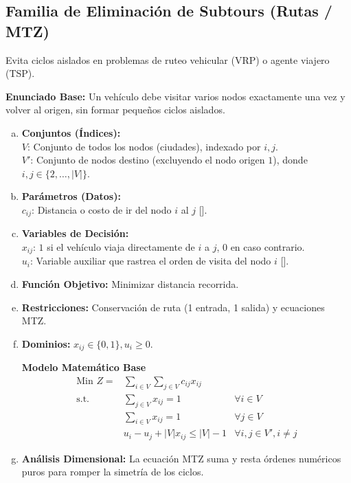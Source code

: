 \documentclass{article}
\begin{document}
	\newpage
	
	\subsection{Familia de Eliminación de Subtours (Rutas / MTZ)}
	Evita ciclos aislados en problemas de ruteo vehicular (VRP) o agente viajero (TSP).
	
	\textbf{Enunciado Base:} Un vehículo debe visitar varios nodos exactamente una vez y volver al origen, sin formar pequeños ciclos aislados.
	
	\begin{enumerate}[a)]
		\item \textbf{Conjuntos (Índices):}\\
		$V$: Conjunto de todos los nodos (ciudades), indexado por $i, j$.\\
		$V'$: Conjunto de nodos destino (excluyendo el nodo origen $1$), donde $i, j \in \{2, \dots, |V|\}$.
		
		\item \textbf{Parámetros (Datos):}\\
		$c_{ij}$: Distancia o costo de ir del nodo $i$ al $j$ [].
		
		\item \textbf{Variables de Decisión:}\\
		$x_{ij}$: $1$ si el vehículo viaja directamente de $i$ a $j$, $0$ en caso contrario.\\
		$u_i$: Variable auxiliar que rastrea el orden de visita del nodo $i$ [].
		\item \textbf{Función Objetivo:} Minimizar distancia recorrida.
		\item \textbf{Restricciones:} Conservación de ruta (1 entrada, 1 salida) y ecuaciones MTZ.
		\item \textbf{Dominios:} $x_{ij} \in \{0, 1\}, u_i \geq 0$.
		
		\begin{center}
			\textbf{Modelo Matemático Base}
			$$\begin{aligned}
				\text{Min } Z = & \sum_{i \in V} \sum_{j \in V} c_{ij} x_{ij} \\
				\text{s.t.} \quad & \sum_{j \in V} x_{ij} = 1 & \forall i \in V \\
				& \sum_{i \in V} x_{ij} = 1 & \forall j \in V \\
				& u_i - u_j + |V| x_{ij} \leq |V| - 1 & \forall i, j \in V', i \neq j
			\end{aligned}$$
		\end{center}
		
		\item \textbf{Análisis Dimensional:} La ecuación MTZ suma y resta órdenes numéricos puros para romper la simetría de los ciclos.
	\end{enumerate}
	
\end{document}
